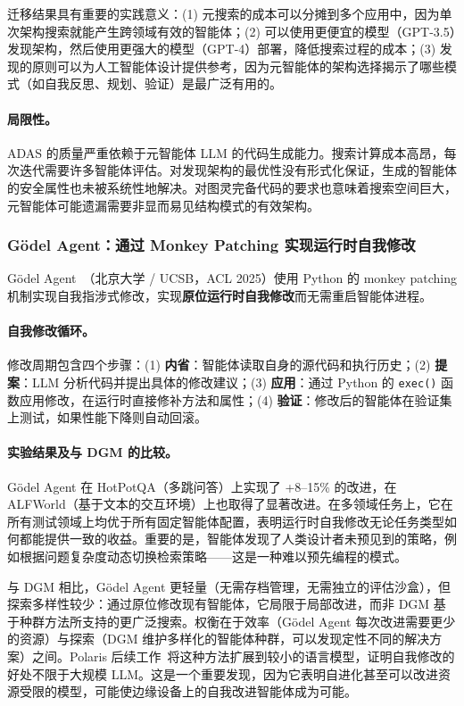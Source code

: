 迁移结果具有重要的实践意义：(1) 元搜索的成本可以分摊到多个应用中，因为单次架构搜索就能产生跨领域有效的智能体；(2) 可以使用更便宜的模型（GPT-3.5）发现架构，然后使用更强大的模型（GPT-4）部署，降低搜索过程的成本；(3) 发现的原则可以为人工智能体设计提供参考，因为元智能体的架构选择揭示了哪些模式（如自我反思、规划、验证）是最广泛有用的。

\paragraph{局限性。}
ADAS 的质量严重依赖于元智能体 LLM 的代码生成能力。搜索计算成本高昂，每次迭代需要许多智能体评估。对发现架构的最优性没有形式化保证，生成的智能体的安全属性也未被系统性地解决。对图灵完备代码的要求也意味着搜索空间巨大，元智能体可能遗漏需要非显而易见结构模式的有效架构。


\subsubsection{G\"{o}del Agent：通过 Monkey Patching 实现运行时自我修改}

G\"{o}del Agent~\citep{godelagent2024}（北京大学 / UCSB，ACL 2025）使用 Python 的 monkey patching 机制实现自我指涉式修改，实现\textbf{原位运行时自我修改}而无需重启智能体进程。

\paragraph{自我修改循环。}
修改周期包含四个步骤：(1) \textbf{内省}：智能体读取自身的源代码和执行历史；(2) \textbf{提案}：LLM 分析代码并提出具体的修改建议；(3) \textbf{应用}：通过 Python 的 \texttt{exec()} 函数应用修改，在运行时直接修补方法和属性；(4) \textbf{验证}：修改后的智能体在验证集上测试，如果性能下降则自动回滚。

\paragraph{实验结果及与 DGM 的比较。}
G\"{o}del Agent 在 HotPotQA（多跳问答）上实现了 +8--15\% 的改进，在 ALFWorld（基于文本的交互环境）上也取得了显著改进。在多领域任务上，它在所有测试领域上均优于所有固定智能体配置，表明运行时自我修改无论任务类型如何都能提供一致的收益。重要的是，智能体发现了人类设计者未预见到的策略，例如根据问题复杂度动态切换检索策略——这是一种难以预先编程的模式。

与 DGM 相比，G\"{o}del Agent 更轻量（无需存档管理，无需独立的评估沙盒），但探索多样性较少：通过原位修改现有智能体，它局限于局部改进，而非 DGM 基于种群方法所支持的更广泛搜索。权衡在于效率（G\"{o}del Agent 每次改进需要更少的资源）与探索（DGM 维护多样化的智能体种群，可以发现定性不同的解决方案）之间。Polaris 后续工作~\citep{ye2025polaris}将这种方法扩展到较小的语言模型，证明自我修改的好处不限于大规模 LLM。这是一个重要发现，因为它表明自进化甚至可以改进资源受限的模型，可能使边缘设备上的自我改进智能体成为可能。

